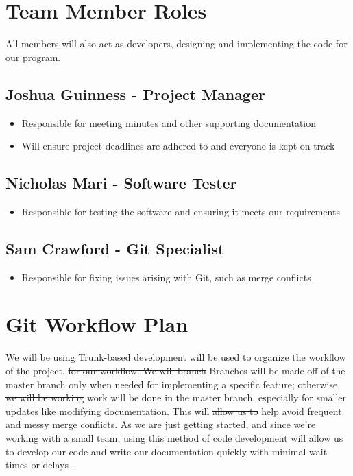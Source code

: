 \documentclass{article}
\begin{document}
\section{Team Member Roles}
\label{roles}
All members will also act as developers, designing and implementing the code for 
our program.

\subsection{Joshua Guinness - Project Manager}
\begin{itemize}
\item Responsible for meeting minutes and other supporting documentation
\item Will ensure project deadlines are adhered to and everyone is kept on track
\end{itemize}

\subsection{Nicholas Mari - Software Tester}
\begin{itemize}
\item Responsible for testing the software and ensuring it meets our requirements
\end{itemize}

\subsection{Sam Crawford - Git Specialist}
\begin{itemize}
\item Responsible for fixing issues arising with Git, such as merge conflicts 
\end{itemize}

\section{Git Workflow Plan}
\st{We will be using} Trunk-based development \color{red} will be used to 
organize the workflow of the project. \color{black} \st{for our workflow. We 
will branch} \color{red} Branches will be made \color{black} off of the master 
branch only when needed for implementing a specific feature; 
otherwise \st{we will be working} \color{red} work will be done \color{black} 
in the master branch, especially for 
smaller updates like modifying documentation. This will \st{allow us to} 
\color{red} help \color{black} avoid 
frequent and messy merge conflicts. As we are just getting started, and since 
we're working with a small team, using this method of code development will 
allow us to develop our code and write our documentation quickly with minimal 
wait times or delays \cite{trunkbased}.
\end{document}
